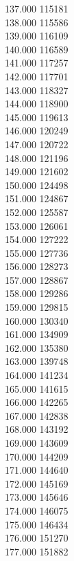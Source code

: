 { 137.000	115181 \\
 138.000	115586 \\
 139.000	116109 \\
 140.000	116589 \\
 141.000	117257 \\
 142.000	117701 \\
 143.000	118327 \\
 144.000	118900 \\
 145.000	119613 \\
 146.000	120249 \\
 147.000	120722 \\
 148.000	121196 \\
 149.000	121602 \\
 150.000	124498 \\
 151.000	124867 \\
 152.000	125587 \\
 153.000	126061 \\
 154.000	127222 \\
 155.000	127736 \\
 156.000	128273 \\
 157.000	128867 \\
 158.000	129286 \\
 159.000	129815 \\
 160.000	130340 \\
 161.000	134909 \\
 162.000	135380 \\
 163.000	139748 \\
 164.000	141234 \\
 165.000	141615 \\
 166.000	142265 \\
 167.000	142838 \\
 168.000	143192 \\
 169.000	143609 \\
 170.000	144209 \\
 171.000	144640 \\
 172.000	145169 \\
 173.000	145646 \\
 174.000	146075 \\
 175.000	146434 \\
 176.000	151270 \\
 177.000	151882 \\
}
